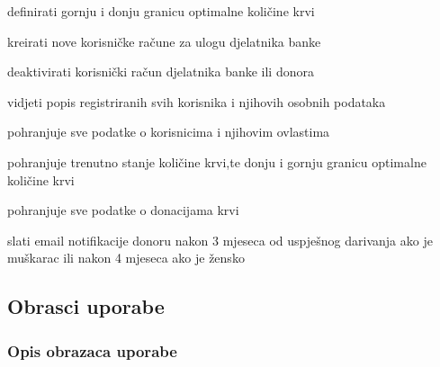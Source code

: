 \begin{packed_enum}
	\begin{packed_enum}
		
		\item definirati gornju i donju granicu optimalne količine krvi
		\item kreirati nove korisničke račune za ulogu djelatnika banke
		\item deaktivirati korisnički račun djelatnika banke ili donora
		\item vidjeti popis registriranih svih korisnika i njihovih osobnih podataka
		
	\end{packed_enum}
	
	\item  {}
	
	\begin{packed_enum}
		
		\item pohranjuje sve podatke o korisnicima i njihovim ovlastima
		\item pohranjuje trenutno stanje količine krvi,te donju i gornju granicu optimalne količine krvi
		\item pohranjuje sve podatke o donacijama krvi
	\end{packed_enum}
	
	\item  {}
	
	\begin{packed_enum}
		
		\item slati email notifikacije donoru nakon 3 mjeseca od uspješnog darivanja ako je muškarac ili nakon 4 mjeseca ako je žensko
		
	\end{packed_enum}
\end{packed_enum}



\eject 



\subsection{Obrasci uporabe}

\subsubsection{Opis obrazaca uporabe}


